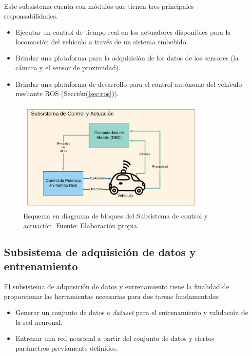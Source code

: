     Este subsistema cuenta con módulos que tienen tres principales responsabilidades.
    
    \begin{itemize}
        \item Ejecutar un control de tiempo real en los actuadores disponibles para la locomoción del vehículo a través de un sistema embebido.
        \item Brindar una plataforma para la adquisición de los datos de los sensores (la cámara y el sensor de proximidad).
        \item Brindar una plataforma de desarrollo para el control autónomo del vehículo mediante ROS (Sección(\ref{sec:ros})).
    \end{itemize}

    \begin{figure}[!h] 
        \centering
        \includegraphics[width=0.85\textwidth]{img/control_esq}
        \caption[Subsistema de control y actuación]{Esquema en diagrama de bloques del Subsistema de control y actuación. Fuente: Elaboración propia. }
        \label{fig:control_esq}
    \end{figure}

    \subsection{Subsistema de adquisición de datos y entrenamiento}\label{sec:esqdaq}
    El subsistema de adquisición de datos y entrenamiento tiene la finalidad de proporcionar las herramientas necesarias para 
    dos tareas fundamentales:
    \begin{itemize}
        \item Generar un conjunto de datos o \textit{dataset} para el entrenamiento y validación de la red neuronal.
        \item Entrenar una red neuronal a partir del conjunto de datos y ciertos parámetros previamente definidos.
    \end{itemize}

